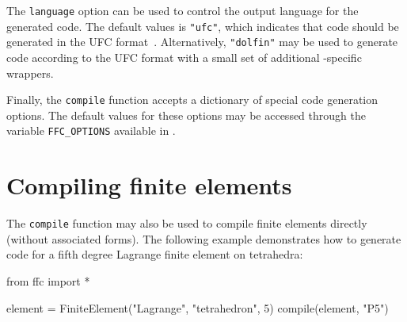 The \texttt{language} option can be used to control the output
language for the generated code. The default values is
\texttt{"ufc"}, which indicates that code should be generated in the
UFC format~\cite{www:ufc}. Alternatively, \texttt{"dolfin"} may be
used to generate code according to the UFC format with a small set of
additional \dolfin{}-specific wrappers.

Finally, the \texttt{compile} function accepts a dictionary of special
code generation options. The default values for these options may be
accessed through the variable \texttt{FFC\_OPTIONS} available in
\ffc{}.

\section{Compiling finite elements}

The \texttt{compile} function may also be used to compile finite
elements directly (without associated forms). The following example
demonstrates how to generate code for a fifth degree Lagrange finite
element on tetrahedra:
\begin{code}
from ffc import *

element = FiniteElement("Lagrange", "tetrahedron", 5)
compile(element, "P5")
\end{code}

